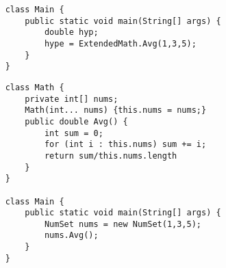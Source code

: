 \documentclass[letterpaper, openany, justified]{tufte-book}
\begin{document}
\begin{fullwidth}
\begin{multicols}{2}
\begin{lstlisting}
    class Main {
        public static void main(String[] args) {
            double hyp;
            hype = ExtendedMath.Avg(1,3,5);
        }
    }
\end{lstlisting}

\columnbreak
\begin{lstlisting}
    class Math {
        private int[] nums;
        Math(int... nums) {this.nums = nums;}
        public double Avg() {
            int sum = 0;
            for (int i : this.nums) sum += i;
            return sum/this.nums.length
        }
    }

    class Main {
        public static void main(String[] args) {
            NumSet nums = new NumSet(1,3,5);
            nums.Avg();
        }
    }
\end{lstlisting}
\end{multicols}

\end{fullwidth}
\end{document}
